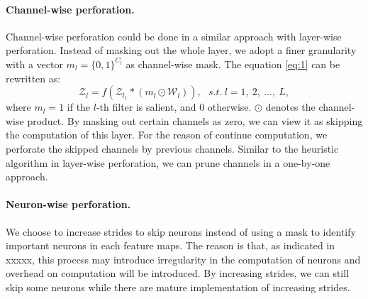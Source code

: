 \documentclass[pageno]{jpaper}
\begin{document}
\paragraph{Channel-wise perforation.} Channel-wise perforation could be done in a similar approach with layer-wise perforation. Instead of masking out the whole layer, we adopt a finer granularity with a vector $m_l = \{0,1\}^{C_l}$ as channel-wise mask. The equation \ref{eq:1} can be rewritten as:
\begin{equation} \label{eq: 3}
    \mathcal{Z}_l = f(\mathcal{Z}_{l_1} \ast (m_l \odot \mathcal{W}_l) ), \ \ \  s.t. \: l = 1,\: 2, \: \dots, \: L,
\end{equation}
where $m_l = 1$ if the $l$-th filter is salient, and $0$ otherwise. $\odot$ denotes the channel-wise product. By masking out certain channels as zero, we can view it as skipping the computation of this layer. For the reason of continue computation, we perforate the skipped channels by previous channels. Similar to the heuristic algorithm in layer-wise perforation, we can prune channels in a one-by-one approach.

\paragraph{Neuron-wise perforation.} We choose to increase strides to skip neurons instead of using a mask to identify important neurons in each feature maps. The reason is that, as indicated in xxxxx, this process may introduce irregularity in the computation of neurons and overhead on computation will be introduced. By increasing strides, we can still skip some neurons while there are mature implementation of increasing strides.
\end{document}
